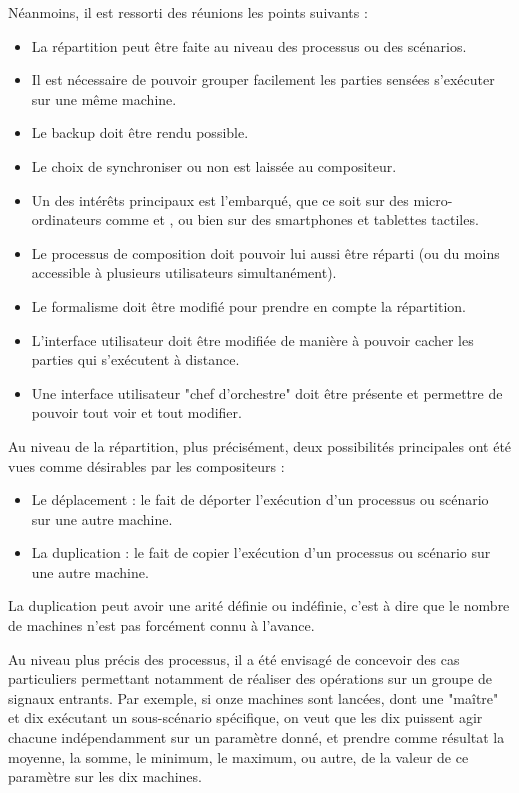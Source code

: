 Néanmoins, il est ressorti des réunions les points suivants : 
\begin{itemize}
	\item La répartition peut être faite au niveau des processus ou des scénarios.
	\item Il est nécessaire de pouvoir grouper facilement les parties sensées s'exécuter sur une même machine.
	\item Le backup doit être rendu possible.
	\item Le choix de synchroniser ou non est laissée au compositeur.
	\item Un des intérêts principaux est l'embarqué, que ce soit sur des micro-ordinateurs comme  et , ou bien sur des smartphones et tablettes tactiles.
	\item Le processus de composition doit pouvoir lui aussi être réparti (ou du moins accessible à plusieurs utilisateurs simultanément).
	\item Le formalisme doit être modifié pour prendre en compte la répartition.
	\item L'interface utilisateur doit être modifiée de manière à pouvoir cacher les parties qui s'exécutent à distance.
	\item Une interface utilisateur "chef d'orchestre" doit être présente et permettre de pouvoir tout voir et tout modifier.
\end{itemize}

Au niveau de la répartition, plus précisément, deux possibilités principales ont été vues comme désirables par les compositeurs : 
\begin{itemize}
	\item Le déplacement : le fait de déporter l'exécution d'un processus ou scénario sur une autre machine.
	\item La duplication : le fait de copier l'exécution d'un processus ou scénario sur une autre machine.
\end{itemize}

La duplication peut avoir une arité définie ou indéfinie, c'est à dire que le nombre de machines n'est pas forcément connu à l'avance.

Au niveau plus précis des processus, il a été envisagé de concevoir des cas particuliers permettant notamment de réaliser des opérations sur un groupe de signaux entrants. Par exemple, si onze machines sont lancées, dont une "maître" et dix exécutant un sous-scénario spécifique, on veut que les dix puissent agir chacune indépendamment sur un paramètre donné, et prendre comme résultat la moyenne, la somme, le minimum, le maximum, ou autre, de la valeur de ce paramètre sur les dix machines.

